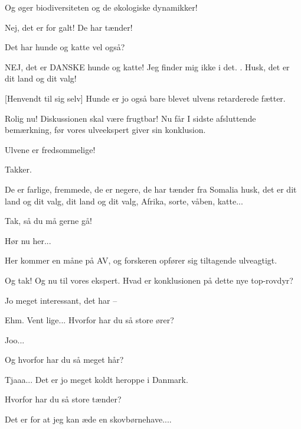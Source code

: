 \documentclass[a4paper,12pt]{article}
\begin{document}
\begin{sketch}
Og øger biodiversiteten og de økologiske dynamikker!

Nej, det er for galt! De har tænder! 

Det har hunde og katte vel også?

NEJ, det er DANSKE hunde og katte! Jeg finder mig ikke i det. . Husk, det er dit land og dit valg!

[Henvendt til sig selv] Hunde er jo også bare blevet ulvens retarderede fætter. 

Rolig nu! Diskussionen skal være frugtbar! Nu får I sidste afsluttende bemærkning, før vores ulveekspert giver sin konklusion.

Ulvene er fredsommelige! 

Takker.

De er farlige, fremmede, de er negere, de har tænder fra Somalia husk, det er dit land og dit valg, dit land og dit valg, Afrika, sorte, våben, katte... 

Tak, så du må gerne gå!

Hør nu her... 


\scene Her kommer en måne på AV, og forskeren opfører sig tiltagende ulveagtigt.

Og tak! Og nu til vores ekspert. Hvad er konklusionen på dette nye top-rovdyr?

Jo meget interessant, det har --

Ehm. Vent lige... Hvorfor har du så store ører?

Joo...

Og hvorfor har du så meget hår?

Tjaaa... Det er jo meget koldt heroppe i Danmark. 

Hvorfor har du så store tænder?

Det er for at jeg kan æde en skovbørnehave.... 





\end{sketch}
\end{document}
